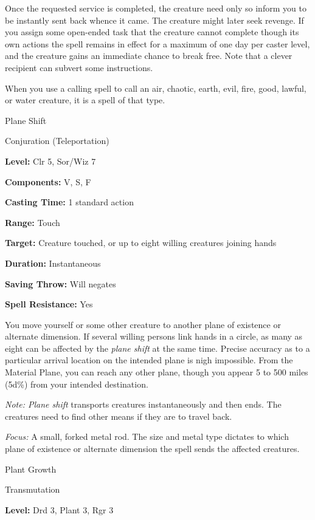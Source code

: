 \documentclass{article}
\begin{document}
Once the requested service is completed, the creature need only so inform you to 
be instantly sent back whence it came. The creature might later seek revenge. If 
you assign some open-ended task that the creature cannot complete though its own 
actions the spell remains in effect for a maximum of one day per caster level, 
and the creature gains an immediate chance to break free. Note that a clever recipient 
can subvert some instructions.

When you use a calling spell to call an air, chaotic, earth, evil, fire, good, 
lawful, or water creature, it is a spell of that type. 

\vspace{12pt}
Plane Shift

Conjuration (Teleportation)

\textbf{Level:} Clr 5, Sor/Wiz 7

\textbf{Components:} V, S, F

\textbf{Casting Time:} 1 standard action

\textbf{Range:} Touch

\textbf{Target:} Creature touched, or up to eight willing creatures joining hands

\textbf{Duration:} Instantaneous

\textbf{Saving Throw: }Will negates

\textbf{Spell Resistance:} Yes

You move yourself or some other creature to another plane of existence or alternate 
dimension. If several willing persons link hands in a circle, as many as eight 
can be affected by the \textit{plane shift }at the same time. Precise accuracy 
as to a particular arrival location on the intended plane is nigh impossible. From 
the Material Plane, you can reach any other plane, though you appear 5 to 500 miles 
(5d\%) from your intended destination.

\textit{Note: Plane shift }transports creatures instantaneously and then ends. 
The creatures need to find other means if they are to travel back.

\textit{Focus: }A small, forked metal rod. The size and metal type dictates to 
which plane of existence or alternate dimension the spell sends the affected creatures. 

\vspace{12pt}
Plant Growth

Transmutation

\textbf{Level:} Drd 3, Plant 3, Rgr 3
\end{document}
